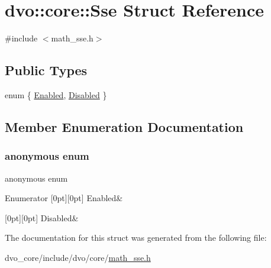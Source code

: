 \hypertarget{structdvo_1_1core_1_1_sse}{}\section{dvo\+:\+:core\+:\+:Sse Struct Reference}
\label{structdvo_1_1core_1_1_sse}


{\ttfamily \#include $<$math\+\_\+sse.\+h$>$}

\subsection*{Public Types}
\begin{DoxyCompactItemize}
\item 
enum \{ \mbox{\hyperlink{structdvo_1_1core_1_1_sse_a4fd9b55a1ec035f837cc78f33d45a9adadefbacd4d80d2e8ba64c1583a4fda95a}{Enabled}}, 
\mbox{\hyperlink{structdvo_1_1core_1_1_sse_a4fd9b55a1ec035f837cc78f33d45a9adaeeb0a9210cb89d05bec4d9b12e628ae3}{Disabled}}
 \}
\end{DoxyCompactItemize}


\subsection{Member Enumeration Documentation}
\mbox{\label{structdvo_1_1core_1_1_sse_a4fd9b55a1ec035f837cc78f33d45a9ad}} 
\subsubsection{\texorpdfstring{anonymous enum}{anonymous enum}}
{\footnotesize\ttfamily anonymous enum}

\begin{DoxyEnumFields}{Enumerator}
[0pt][0pt]{}\mbox{\label{structdvo_1_1core_1_1_sse_a4fd9b55a1ec035f837cc78f33d45a9adadefbacd4d80d2e8ba64c1583a4fda95a}} 
Enabled&\\
\hline

[0pt][0pt]{}\mbox{\label{structdvo_1_1core_1_1_sse_a4fd9b55a1ec035f837cc78f33d45a9adaeeb0a9210cb89d05bec4d9b12e628ae3}} 
Disabled&\\
\hline

\end{DoxyEnumFields}


The documentation for this struct was generated from the following file\+:\begin{DoxyCompactItemize}
\item 
dvo\+\_\+core/include/dvo/core/\mbox{\hyperlink{math__sse_8h}{math\+\_\+sse.\+h}}\end{DoxyCompactItemize}
